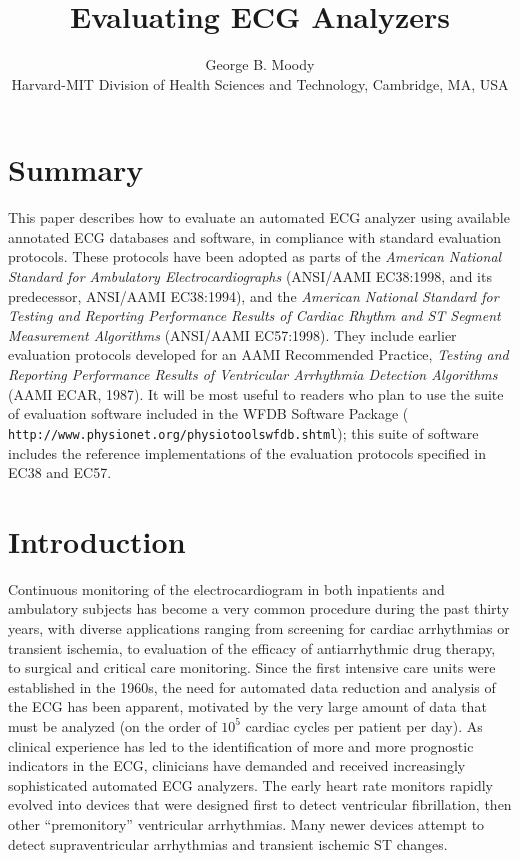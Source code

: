 \documentclass[twoside]{article}
\title{Evaluating ECG Analyzers}
\author{George B. Moody\\
Harvard-MIT Division of Health Sciences and Technology, Cambridge, MA, USA}
\date{}
\begin{document}
\setcounter{page}{118}

\maketitle

\section*{Summary}
This paper describes how to evaluate an automated ECG analyzer using
available annotated ECG databases and software, in compliance with
standard evaluation protocols.  These protocols have been adopted as
parts of the {\em American National Standard for Ambulatory
Electrocardiographs} (ANSI/AAMI EC38:1998, and its predecessor,
ANSI/AAMI EC38:1994), and the {\em American National Standard for
Testing and Reporting Performance Results of Cardiac Rhythm and ST
Segment Measurement Algorithms} (ANSI/AAMI EC57:1998).  They include
earlier evaluation protocols developed for an AAMI Recommended
Practice, {\em Testing and Reporting Performance Results of
Ventricular Arrhythmia Detection Algorithms} (AAMI ECAR, 1987).  It
will be most useful to readers who plan to use the suite of evaluation
software included in the WFDB Software Package ({\tt
http://www.\-physio\-net.\-org/\-physio\-tools\-wfdb.\-shtml}); this
suite of software includes the reference implementations of the
evaluation protocols specified in EC38 and EC57.

\section{Introduction}
Continuous monitoring of the electrocardiogram in both inpatients and
ambulatory subjects has become a very common procedure during the past
thirty years, with diverse applications ranging from screening for cardiac
arrhythmias or transient ischemia, to evaluation of the efficacy of
antiarrhythmic drug therapy, to surgical and critical care monitoring.
Since the first intensive care units were established in the 1960s,
the need for automated data reduction and analysis of the ECG has been
apparent, motivated by the very large amount of data that must be
analyzed (on the order of $10^{5}$ cardiac cycles per patient per
day).  As clinical experience has led to the identification of more
and more prognostic indicators in the ECG, clinicians have demanded
and received increasingly sophisticated automated ECG analyzers.  The
early heart rate monitors rapidly evolved into devices that were
designed first to detect ventricular fibrillation, then other
``premonitory'' ventricular arrhythmias.  Many newer devices attempt
to detect supraventricular arrhythmias and transient ischemic ST
changes.
\end{document}
